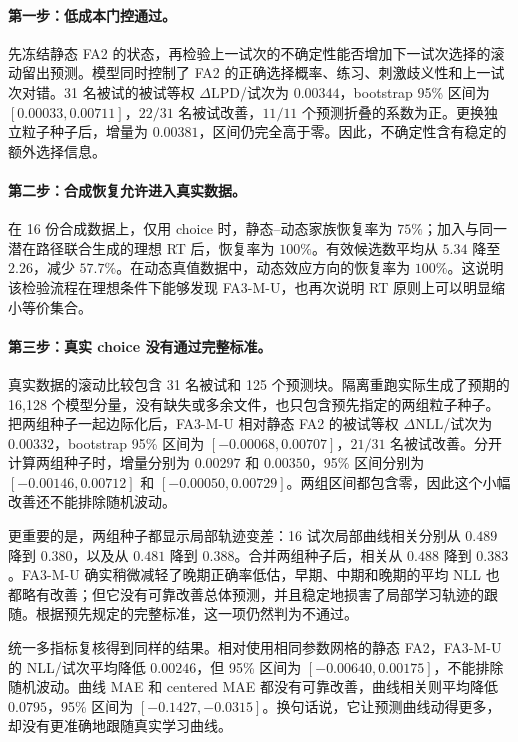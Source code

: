 \paragraph{第一步：低成本门控通过。}
先冻结静态 FA2 的状态，再检验上一试次的不确定性能否增加下一试次选择的滚动留出预测。模型同时控制了 FA2 的正确选择概率、练习、刺激歧义性和上一试次对错。31 名被试的被试等权 $\Delta\mathrm{LPD}$/试次为 $0.00344$，bootstrap 95\% 区间为 $[0.00033,0.00711]$，$22/31$ 名被试改善，$11/11$ 个预测折叠的系数为正。更换独立粒子种子后，增量为 $0.00381$，区间仍完全高于零。因此，不确定性含有稳定的额外选择信息。

\paragraph{第二步：合成恢复允许进入真实数据。}
在 16 份合成数据上，仅用 choice 时，静态--动态家族恢复率为 $75\%$；加入与同一潜在路径联合生成的理想 RT 后，恢复率为 $100\%$。有效候选数平均从 $5.34$ 降至 $2.26$，减少 $57.7\%$。在动态真值数据中，动态效应方向的恢复率为 $100\%$。这说明该检验流程在理想条件下能够发现 FA3-M-U，也再次说明 RT 原则上可以明显缩小等价集合。

\paragraph{第三步：真实 choice 没有通过完整标准。}
真实数据的滚动比较包含 31 名被试和 125 个预测块。隔离重跑实际生成了预期的 16,128 个模型分量，没有缺失或多余文件，也只包含预先指定的两组粒子种子。把两组种子一起边际化后，FA3-M-U 相对静态 FA2 的被试等权 $\Delta\mathrm{NLL}$/试次为 $0.00332$，bootstrap 95\% 区间为 $[-0.00068,0.00707]$，$21/31$ 名被试改善。分开计算两组种子时，增量分别为 $0.00297$ 和 $0.00350$，95\% 区间分别为 $[-0.00146,0.00712]$ 和 $[-0.00050,0.00729]$。两组区间都包含零，因此这个小幅改善还不能排除随机波动。

更重要的是，两组种子都显示局部轨迹变差：16 试次局部曲线相关分别从 $0.489$ 降到 $0.380$，以及从 $0.481$ 降到 $0.388$。合并两组种子后，相关从 $0.488$ 降到 $0.383$。FA3-M-U 确实稍微减轻了晚期正确率低估，早期、中期和晚期的平均 NLL 也都略有改善；但它没有可靠改善总体预测，并且稳定地损害了局部学习轨迹的跟随。根据预先规定的完整标准，这一项仍然判为不通过。

统一多指标复核得到同样的结果。相对使用相同参数网格的静态 FA2，FA3-M-U 的 NLL/试次平均降低 $0.00246$，但 95\% 区间为 $[-0.00640,0.00175]$，不能排除随机波动。曲线 MAE 和 centered MAE 都没有可靠改善，曲线相关则平均降低 $0.0795$，95\% 区间为 $[-0.1427,-0.0315]$。换句话说，它让预测曲线动得更多，却没有更准确地跟随真实学习曲线。

